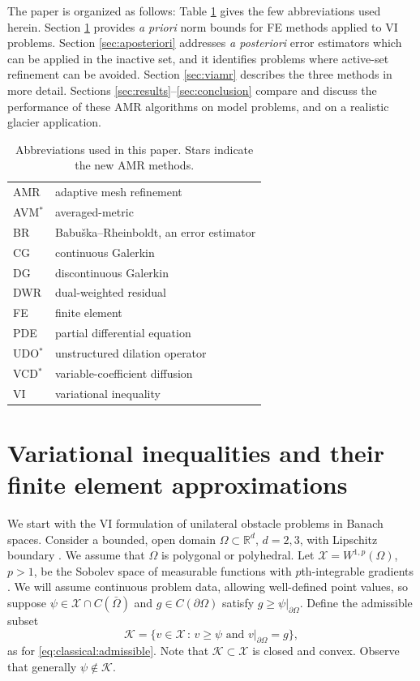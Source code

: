 \documentclass[]{interact}
\theoremstyle{plain}%
\theoremstyle{definition}
\theoremstyle{remark}
\newcommand{\RR}{\mathbb{R}}
\newcommand{\cK}{\mathcal{K}}
\newcommand{\cX}{\mathcal{X}}
\begin{document}
The paper is organized as follows:  Table \ref{tab:abbrev} gives the few abbreviations used herein.  Section \ref{sec:vifem} provides \emph{a priori} norm bounds for FE methods applied to VI problems.  Section \ref{sec:aposteriori} addresses \emph{a posteriori} error estimators which can be applied in the inactive set, and it identifies problems where active-set refinement can be avoided.  Section \ref{sec:viamr} describes the three methods in more detail.  Sections \ref{sec:results}--\ref{sec:conclusion} compare and discuss the performance of these AMR algorithms on model problems, and on a realistic glacier application.

\begin{table}[ht]
\centering
\begin{tabular}{ll}
AMR       & adaptive mesh refinement \\
AVM$^*$   & averaged-metric \\
BR        & Babu\v{s}ka--Rheinboldt, an error estimator \\
CG        & continuous Galerkin \\
DG        & discontinuous Galerkin \\
DWR       & dual-weighted residual \\
FE        & finite element \\
PDE       & partial differential equation \\
UDO$^*$   & unstructured dilation operator \\
VCD$^*$   & variable-coefficient diffusion \\
VI        & variational inequality
\end{tabular}

\caption{Abbreviations used in this paper.  Stars indicate the new AMR methods.}
\label{tab:abbrev}
\end{table}


\section{Variational inequalities and their finite element approximations} \label{sec:vifem}

We start with the VI formulation of unilateral obstacle problems in Banach spaces.  Consider a bounded, open domain $\Omega \subset \RR^d$, $d=2,3$, with Lipschitz boundary \cite{Ciarlet2002}.  We assume that $\Omega$ is polygonal or polyhedral.  Let $\cX = W^{1,p}(\Omega)$, $p>1$, be the Sobolev space of measurable functions with $p$th-integrable gradients \cite{Evans2010}.  We will assume continuous problem data, allowing well-defined point values, so suppose $\psi \in \cX \cap C(\bar\Omega)$ and $g\in C(\partial \Omega)$ satisfy $g \ge \psi|_{\partial\Omega}$.  Define the admissible subset
\begin{equation} \label{eq:admissible}
\cK = \{v \in \cX \,:\, v \ge \psi \text{ and } v|_{\partial \Omega} = g\},
\end{equation}
as for \eqref{eq:classical:admissible}.  Note that $\cK\subset \cX$ is closed and convex.  Observe that generally $\psi\notin\cK$.
\end{document}
